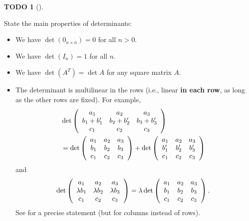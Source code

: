 \documentclass[numbers=enddot,12pt,final,onecolumn,notitlepage]{scrartcl}%
\theoremstyle{definition}
\newtheorem{quest}[theo]{TODO}
\newenvironment{todo}[1][]
{\begin{quest}[#1]\begin{leftbar}}
{\end{leftbar}\end{quest}}
\begin{document}
\begin{todo}
State the main properties of determinants:

\begin{itemize}
\item We have $\det\left(  0_{n\times n}\right)  =0$ for all $n>0$.

\item We have $\det\left(  I_{n}\right)  =1$ for all $n$.

\item We have $\det\left(  A^{T}\right)  =\det A$ for any square matrix $A$.

\item The determinant is multilinear in the rows (i.e., linear \textbf{in each
row}, as long as the other rows are fixed). For example,%
\begin{align*}
&  \det\left(
\begin{array}
[c]{ccc}%
a_{1} & a_{2} & a_{3}\\
b_{1}+b_{1}^{\prime} & b_{2}+b_{2}^{\prime} & b_{3}+b_{3}^{\prime}\\
c_{1} & c_{2} & c_{3}%
\end{array}
\right) \\
&  =\det\left(
\begin{array}
[c]{ccc}%
a_{1} & a_{2} & a_{3}\\
b_{1} & b_{2} & b_{3}\\
c_{1} & c_{2} & c_{3}%
\end{array}
\right)  +\det\left(
\begin{array}
[c]{ccc}%
a_{1} & a_{2} & a_{3}\\
b_{1}^{\prime} & b_{2}^{\prime} & b_{3}^{\prime}\\
c_{1} & c_{2} & c_{3}%
\end{array}
\right)
\end{align*}
and%
\[
\det\left(
\begin{array}
[c]{ccc}%
a_{1} & a_{2} & a_{3}\\
\lambda b_{1} & \lambda b_{2} & \lambda b_{3}\\
c_{1} & c_{2} & c_{3}%
\end{array}
\right)  =\lambda\det\left(
\begin{array}
[c]{ccc}%
a_{1} & a_{2} & a_{3}\\
b_{1} & b_{2} & b_{3}\\
c_{1} & c_{2} & c_{3}%
\end{array}
\right)  .
\]
See \cite[Theorem 8.2.3, 3.]{LaNaSc16} for a precise statement (but for
columns instead of rows).


\end{itemize}
\end{todo}
\end{document}
